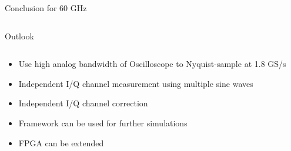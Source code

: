 \documentclass[10pt]{beamer}
\newcommand*{\ClipSep}{0.3cm}%
\begin{document}
\begin{frame}{Conclusion for 60 GHz}
\begin{columns}[T]
\begin{column}{.4\textwidth}
    \end{column}
  \end{columns}
\end{frame}

\begin{frame}{Outlook}

  \begin{columns}[T]
    \begin{column}{.6\textwidth}
      \begin{itemize}
      \item Use high analog bandwidth of Oscilloscope to Nyquist-sample at 1.8 GS/s
      \item Independent I/Q channel measurement using multiple sine waves
      \item Independent I/Q channel correction
      \item Framework can be used for further simulations
      \item FPGA can be extended
      \end{itemize}
    \end{column}
    \begin{column}{.4\textwidth}
\end{column}
\end{columns}
\end{frame}
\end{document}
